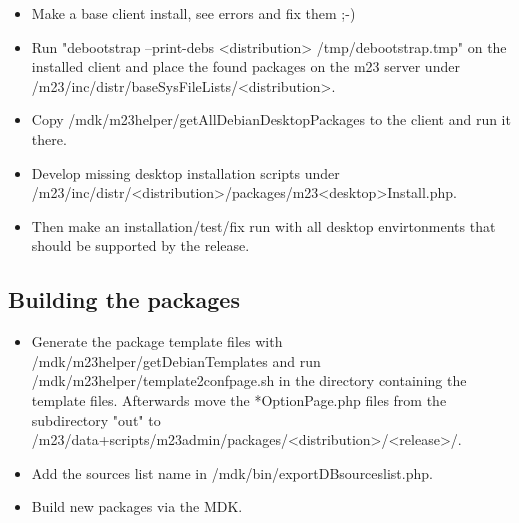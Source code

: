 \begin{itemize}
\item Make a base client install, see errors and fix them ;-)

\item Run "debootstrap --print-debs <distribution> /tmp/debootstrap.tmp" on the installed client and place the found packages on the m23 server under /m23/inc/distr/baseSysFileLists/<distribution>.

\item Copy /mdk/m23helper/getAllDebianDesktopPackages to the client and run it there.

\item Develop missing desktop installation scripts under /m23/inc/distr/<distribution>/packages/m23<desktop>Install.php.

\item Then make an installation/test/fix run with all desktop envirtonments that should be supported by the release.
\end{itemize}



\subsection{Building the packages}
\begin{itemize}
\item Generate the package template files with /mdk/m23helper/getDebianTemplates and run /mdk/m23helper/template2confpage.sh in the directory containing the template files. Afterwards move the *OptionPage.php files from the subdirectory "out" to /m23/data+scripts/m23admin/packages/<distribution>/<release>/.

\item Add the sources list name in /mdk/bin/exportDBsourceslist.php.

\item Build new packages via the MDK.
\end{itemize}